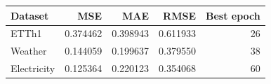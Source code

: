 \begin{tabular}{@{}lrrrr@{}}
\toprule
Dataset & MSE & MAE & RMSE & Best epoch \\
\midrule
ETTh1 & 0.374462 & 0.398943 & 0.611933 & 26 \\
Weather & 0.144059 & 0.199637 & 0.379550 & 38 \\
Electricity & 0.125364 & 0.220123 & 0.354068 & 60 \\
\bottomrule
\end{tabular}
